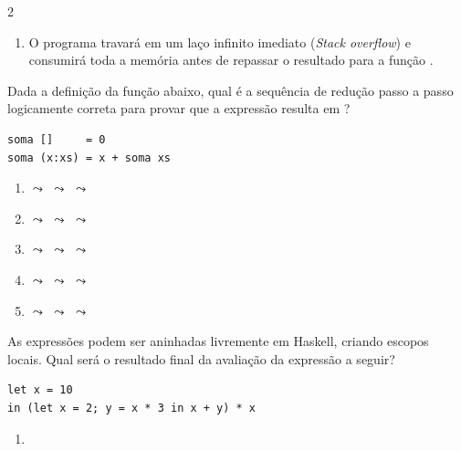 \documentclass[a4paper,10pt,brazil]{article}
\begin{document}
\begin{multicols}{2}
\begin{enumerate}
  \item O programa travará em um laço infinito imediato (\emph{Stack overflow}) e consumirá toda a memória antes de repassar o resultado para a função .


\end{enumerate}

Dada a definição da função  abaixo, qual é a sequência de redução passo a passo logicamente correta para provar que a expressão  resulta em ?

\begin{verbatim}
soma []     = 0
soma (x:xs) = x + soma xs
\end{verbatim}

\begin{enumerate}
  \item {} $\leadsto$  $\leadsto$  $\leadsto$ 

  \item {} $\leadsto$  $\leadsto$  $\leadsto$ 

  \item {} $\leadsto$  $\leadsto$  $\leadsto$ 

  \item {} $\leadsto$  $\leadsto$  $\leadsto$ 

  \item {} $\leadsto$  $\leadsto$  $\leadsto$ 


\end{enumerate}

As expressões  podem ser aninhadas livremente em Haskell, criando escopos locais. Qual será o resultado final da avaliação da expressão a seguir?
\begin{verbatim}
let x = 10 
in (let x = 2; y = x * 3 in x + y) * x
\end{verbatim}

\begin{enumerate}
  \item {}


\end{enumerate}
\end{multicols}
\end{document}
